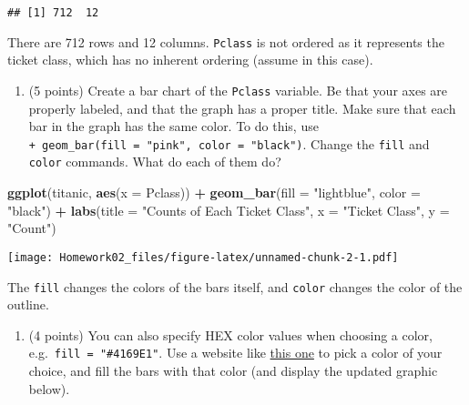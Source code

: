 \documentclass[]{article}
\newenvironment{Shaded}{\begin{snugshade}}{\end{snugshade}}
\newcommand{\DataTypeTok}[1]{\textcolor[rgb]{0.13,0.29,0.53}{#1}}
\newcommand{\KeywordTok}[1]{\textcolor[rgb]{0.13,0.29,0.53}{\textbf{#1}}}
\newcommand{\NormalTok}[1]{#1}
\newcommand{\OperatorTok}[1]{\textcolor[rgb]{0.81,0.36,0.00}{\textbf{#1}}}
\newcommand{\StringTok}[1]{\textcolor[rgb]{0.31,0.60,0.02}{#1}}
\providecommand{\tightlist}{%
  \setlength{\itemsep}{0pt}\setlength{\parskip}{0pt}}
\begin{document}
\begin{verbatim}
## [1] 712  12
\end{verbatim}

There are 712 rows and 12 columns. \texttt{Pclass} is not ordered as it
represents the ticket class, which has no inherent ordering (assume in
this case).

\begin{enumerate}
\def\labelenumi{\alph{enumi}.}
\setcounter{enumi}{1}
\tightlist
\item
  (5 points) Create a bar chart of the \texttt{Pclass} variable. Be that
  your axes are properly labeled, and that the graph has a proper title.
  Make sure that each bar in the graph has the same color. To do this,
  use \texttt{+\ geom\_bar(fill\ =\ "pink",\ color\ =\ "black")}. Change
  the \texttt{fill} and \texttt{color} commands. What do each of them
  do?
\end{enumerate}

\begin{Shaded}
\begin{Highlighting}[]
\KeywordTok{ggplot}\NormalTok{(titanic, }\KeywordTok{aes}\NormalTok{(}\DataTypeTok{x =}\NormalTok{ Pclass)) }\OperatorTok{+}
\StringTok{    }\KeywordTok{geom_bar}\NormalTok{(}\DataTypeTok{fill =} \StringTok{"lightblue"}\NormalTok{, }\DataTypeTok{color =} \StringTok{"black"}\NormalTok{) }\OperatorTok{+}
\StringTok{    }\KeywordTok{labs}\NormalTok{(}\DataTypeTok{title =} \StringTok{"Counts of Each Ticket Class"}\NormalTok{,}
         \DataTypeTok{x =} \StringTok{"Ticket Class"}\NormalTok{,}
         \DataTypeTok{y =} \StringTok{"Count"}\NormalTok{)}
\end{Highlighting}
\end{Shaded}

\texttt{[image: Homework02\_files/figure-latex/unnamed-chunk-2-1.pdf]}

The \texttt{fill} changes the colors of the bars itself, and
\texttt{color} changes the color of the outline.

\begin{enumerate}
\def\labelenumi{\alph{enumi}.}
\setcounter{enumi}{2}
\tightlist
\item
  (4 points) You can also specify HEX color values when choosing a
  color, e.g.~\texttt{fill\ =\ "\#4169E1"}. Use a website like
  \href{http://www.w3schools.com/colors/colors_picker.asp}{this one} to
  pick a color of your choice, and fill the bars with that color (and
  display the updated graphic below).
\end{enumerate}
\end{document}
